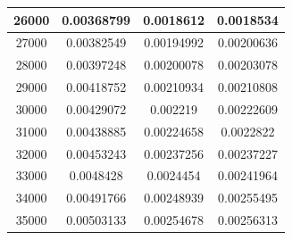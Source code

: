 \begin{center}
\begin{tabular}{| c | c | c | c |}
26000 & 0.00368799 & 0.0018612 & 0.0018534 \\ \hline
27000 & 0.00382549 & 0.00194992 & 0.00200636 \\ \hline
28000 & 0.00397248 & 0.00200078 & 0.00203078 \\ \hline
29000 & 0.00418752 & 0.00210934 & 0.00210808 \\ \hline
30000 & 0.00429072 & 0.002219 & 0.00222609 \\ \hline
31000 & 0.00438885 & 0.00224658 & 0.0022822 \\ \hline
32000 & 0.00453243 & 0.00237256 & 0.00237227 \\ \hline
33000 & 0.0048428 & 0.0024454 & 0.00241964 \\ \hline
34000 & 0.00491766 & 0.00248939 & 0.00255495 \\ \hline
35000 & 0.00503133 & 0.00254678 & 0.00256313 \\ \hline
\hline
\end{tabular}
\end{center}
